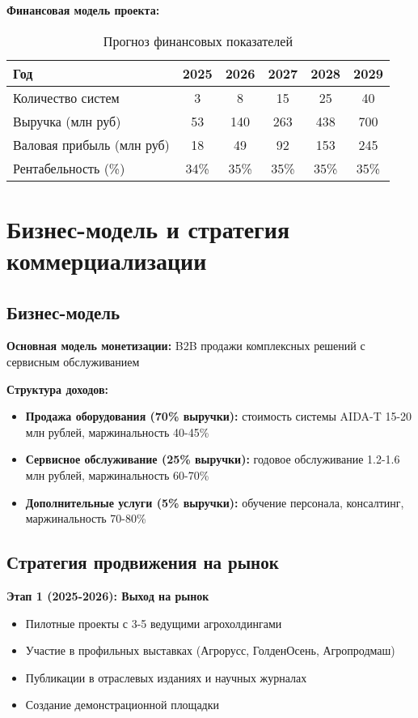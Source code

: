 \documentclass[12pt,a4paper]{article}
\begin{document}
\textbf{Финансовая модель проекта:}

\begin{table}[h]
\centering
\begin{tabular}{|l|c|c|c|c|c|}
\hline
\textbf{Год} & \textbf{2025} & \textbf{2026} & \textbf{2027} & \textbf{2028} & \textbf{2029} \\
\hline
Количество систем & 3 & 8 & 15 & 25 & 40 \\
\hline
Выручка (млн руб) & 53 & 140 & 263 & 438 & 700 \\
\hline
Валовая прибыль (млн руб) & 18 & 49 & 92 & 153 & 245 \\
\hline
Рентабельность (\%) & 34\% & 35\% & 35\% & 35\% & 35\% \\
\hline
\end{tabular}
\caption{Прогноз финансовых показателей}
\end{table}

\section{Бизнес-модель и стратегия коммерциализации}

\subsection{Бизнес-модель}
\textbf{Основная модель монетизации:} B2B продажи комплексных решений с сервисным обслуживанием

\textbf{Структура доходов:}
\begin{itemize}
    \item \textbf{Продажа оборудования (70\% выручки):} стоимость системы AIDA-T 15-20 млн рублей, маржинальность 40-45\%
    \item \textbf{Сервисное обслуживание (25\% выручки):} годовое обслуживание 1.2-1.6 млн рублей, маржинальность 60-70\%
    \item \textbf{Дополнительные услуги (5\% выручки):} обучение персонала, консалтинг, маржинальность 70-80\%
\end{itemize}

\subsection{Стратегия продвижения на рынок}

\textbf{Этап 1 (2025-2026): Выход на рынок}
\begin{itemize}
    \item Пилотные проекты с 3-5 ведущими агрохолдингами
    \item Участие в профильных выставках (Агрорусс, ГолденОсень, Агропродмаш)
    \item Публикации в отраслевых изданиях и научных журналах
    \item Создание демонстрационной площадки
\end{itemize}
\end{document}
